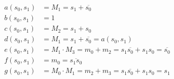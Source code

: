 \documentclass[12pt,openany, tikz,border=10pt]{book}
\begin{document}
			      	\begin{align*}
			      		a(s_0, s_1) & = M_1 = s_1 + \overline{s_0}                                               \\
			      		b(s_0, s_1) & = 1                                                                        \\
			      		c(s_0, s_1) & = M_2 = s_1 + s_0                                                          \\
			      		d(s_0, s_1) & = M_1 = s_1 + \overline{s_0} = a(s_0, s_1)                                 \\
			      		e(s_0, s_1) & = M_1 \cdot M_3 = m_0 + m_2 = s_1 \overline{s_0} + s_1s_0 = \overline{s_0} \\
			      		f(s_0, s_1) & = m_0 = \overline{s_1 s_0}                                                 \\
			      		g(s_0, s_1) & = M_0 \cdot M_1 = m_2 + m_3 = s_1 \overline{s_0} + s_1s_0 = s_1            
			      	\end{align*}
			      	
			      	\newpage
\end{document}
